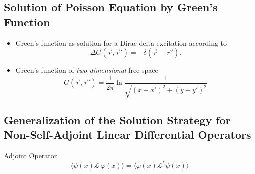 \subsection{Solution of Poisson Equation by Green's Function}
\begin{itemize}
  \item Green's function as solution for a Dirac delta excitation according to
        \begin{equation*}
          \Delta G(\vec{r},\vec{r}') = -\delta(\vec{r} - \vec{r}').
        \end{equation*}
  \item Green's function of \textit{two-dimensional} free space
        \begin{equation*}
          G(\vec{r},\vec{r}') = \dfrac{1}{2\pi}\ln\dfrac{1}{\sqrt{(x-x')^{2} + (y-y')^{2}}}
        \end{equation*}
\end{itemize}

\subsection{Generalization of the Solution Strategy for Non-Self-Adjoint Linear Differential Operators}
\begin{definition}{Adjoint Operator}
    \begin{equation*}
    \langle\psi(x)\mathcal{L}\,\varphi(x)\rangle = \langle\varphi(x)\mathcal{L}^{*}\psi(x)\rangle
    \end{equation*}
\end{definition}
